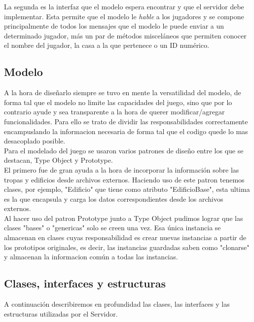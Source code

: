 \documentclass[titlepage,a4paper,12pt]{article}
\begin{document}
La segunda es la interfaz que el modelo espera encontrar y que el servidor debe implementar. Esta permite que el modelo le \textit{hable} a los jugadores y se compone principalmente de todos los mensajes que el modelo le puede enviar a un determinado jugador, más un par de métodos misceláneos que permiten conocer el nombre del jugador, la casa a la que pertenece o un ID numérico.
\subsection{Modelo}
A la hora de diseñarlo siempre se tuvo en mente la versatilidad del modelo, de forma tal que el modelo no limite las capacidades del juego, sino que por lo contrario ayude y sea transparente a la hora de querer modificar/agregar funcionalidades.
Para ello se trato de dividir las responsabilidades correctamente encampuslando la informacion necesaria de forma tal que el codigo quede lo mas desacoplado posible.\\
Para el modelado del juego se usaron varios patrones de diseño entre los que se destacan, Type Object y Prototype.\\
El primero fue de gran ayuda a la hora de incorporar la información sobre las tropas y edificios desde archivos externos. Haciendo uso de este patron tenemos clases, por ejemplo, "Edificio" que tiene como atributo "EdificioBase", esta ultima es la que encapsula y carga los datos correspondientes desde los archivos externos.\\
Al hacer uso del patron Prototype junto a Type Object pudimos lograr que las clases "bases" o "genericas" solo se creen una vez. Esa única instancia se almacenan en clases cuyas responsabilidad es crear nuevas instancias a partir de los prototipos originales, es decir, las instancias guardadas saben como "clonarse" y almacenan la informacion común a todas las instancias. 

\subsection{Clases, interfaces y estructuras}

A continuación describiremos en profundidad las clases, las interfaces y las estructuras utilizadas por el Servidor.
\end{document}
